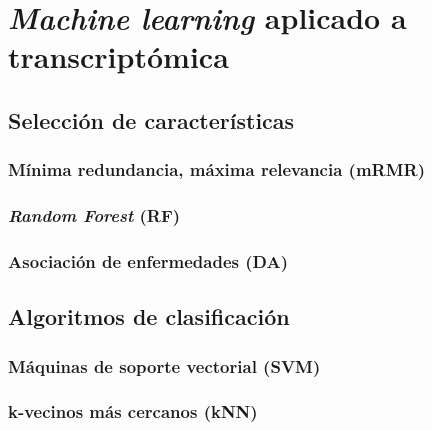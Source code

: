 \chapter{\textit{Machine learning} aplicado a transcriptómica}

\section{Selección de características}

\subsection{Mínima redundancia, máxima relevancia (mRMR)}

\subsection{\textit{Random Forest} (RF)}

\subsection{Asociación de enfermedades (DA)}

\section{Algoritmos de clasificación}

\subsection{Máquinas de soporte vectorial (SVM)}

\subsection{k-vecinos más cercanos (kNN)}


